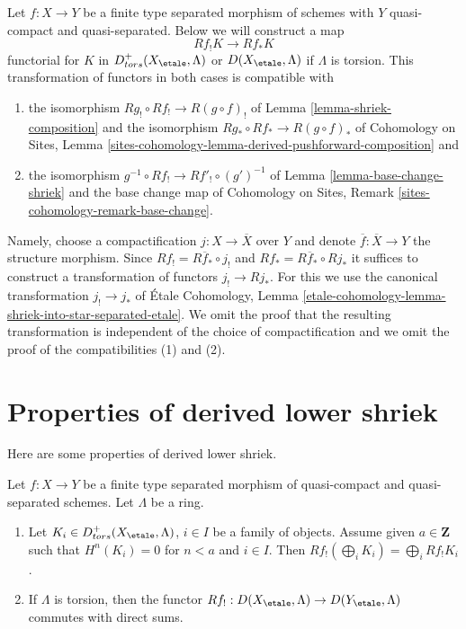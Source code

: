 \begin{remark}
\label{remark-shriek-to-star}
Let $f : X \to Y$ be a finite type separated morphism of schemes
with $Y$ quasi-compact and quasi-separated. Below we will construct
a map
$$
Rf_!K \longrightarrow Rf_*K
$$
functorial for $K$ in $D^+_{tors}(X_\etale, \Lambda)$ or
$D(X_\etale, \Lambda)$ if $\Lambda$ is torsion. This transformation
of functors in both cases is compatible with
\begin{enumerate}
\item the isomorphism $Rg_! \circ Rf_! \to R(g \circ f)_!$ of
Lemma \ref{lemma-shriek-composition} and the isomorphism
$Rg_* \circ Rf_* \to R(g \circ f)_*$ of
Cohomology on Sites, Lemma
\ref{sites-cohomology-lemma-derived-pushforward-composition} and
\item the isomorphism $g^{-1} \circ Rf_! \to Rf'_! \circ (g')^{-1}$
of Lemma \ref{lemma-base-change-shriek}
and the base change map of
Cohomology on Sites, Remark \ref{sites-cohomology-remark-base-change}.
\end{enumerate}
Namely, choose a compactification $j : X \to \overline{X}$ over $Y$
and denote $\overline{f} : \overline{X} \to Y$ the structure morphism.
Since $Rf_! = R\overline{f}_* \circ j_!$ and
$Rf_* = R\overline{f}_* \circ Rj_*$ it suffices to construct a
transformation of functors $j_! \to Rj_*$. For this we use the
canonical transformation $j_! \to j_*$ of
\'Etale Cohomology, Lemma
\ref{etale-cohomology-lemma-shriek-into-star-separated-etale}.
We omit the proof that the resulting transformation is independent
of the choice of compactification and we omit the proof of the
compatibilities (1) and (2).
\end{remark}













\section{Properties of derived lower shriek}
\label{section-derived-lower-shriek-properties}

\noindent
Here are some properties of derived lower shriek.

\begin{lemma}
\label{lemma-derived-lower-shriek-commute-direct-sums}
Let $f : X \to Y$ be a finite type separated morphism of quasi-compact
and quasi-separated schemes. Let $\Lambda$ be a ring.
\begin{enumerate}
\item Let $K_i \in D^+_{tors}(X_\etale, \Lambda)$, $i \in I$ be a family
of objects. Assume given $a \in \mathbf{Z}$ such that
$H^n(K_i) = 0$ for $n < a$ and $i \in I$. Then $Rf_!(\bigoplus_i K_i) =
\bigoplus_i Rf_!K_i$.
\item If $\Lambda$ is torsion, then the functor
$Rf_! : D(X_\etale, \Lambda) \to D(Y_\etale, \Lambda)$
commutes with direct sums.
\end{enumerate}
\end{lemma}

